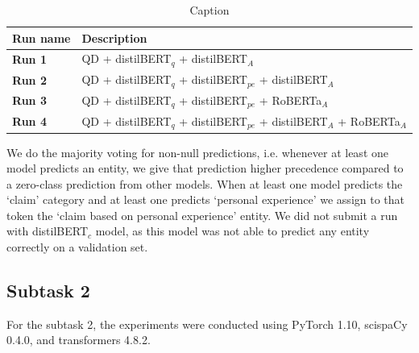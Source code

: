 \documentclass[11pt]{article}
\begin{document}
\begin{table}[]
    \centering
    \begin{tabular}{lp{5cm}}
    \toprule
   Run name & Description \\ \midrule
       \textbf{Run 1}  & QD + distilBERT$_q$ + distilBERT$_A$ \\
       \textbf{Run 2}  & QD + distilBERT$_q$ + distilBERT$_{pe}$ + distilBERT$_A$ \\
        \textbf{Run 3} & QD + distilBERT$_q$ + distilBERT$_{pe}$ + RoBERTa$_A$ \\
        \textbf{Run 4} & QD + distilBERT$_q$ + distilBERT$_{pe}$ + distilBERT$_A$ + RoBERTa$_A$ \\
         \bottomrule
    \end{tabular}
    \caption{Caption}
    \label{tab:my_label}
\end{table}

We do the majority voting for non-null predictions, i.e. whenever at least one model predicts an entity, we give that prediction higher precedence compared to a zero-class prediction from other models.
When at least one model predicts the `claim’ category and at least one predicts `personal experience’ we assign to that token the `claim based on personal experience’ entity.
We did not submit a run with distilBERT$_c$ model, as this model was not able to predict any entity correctly on a validation set.

%
%
%
\subsection{Subtask 2}
\label{exps:task2}
%
For the subtask 2, the experiments were conducted using PyTorch 1.10, scispaCy 0.4.0, and transformers 4.8.2.
\end{document}
